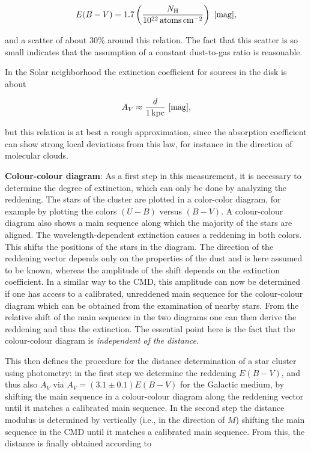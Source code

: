 \documentclass[a4paper,11pt]{article}
\begin{document}
\begin{align*}
    E(B-V) = 1.7 \left(\frac{N_\mathrm{H}}{10^{22}\,{\rm atoms\,cm^{-2}}}\right) ~ [{\rm mag}],
\end{align*}

{\noindent}and a scatter of about 30\% around this relation. The fact that this scatter is so small indicates that the assumption of a constant dust-to-gas ratio is reasonable.

{\noindent}In the Solar neighborhood the extinction coefficient for sources in the disk is about

\begin{align*}
    A_V \approx \frac{d}{1\,{\rm kpc}} ~ [{\rm mag}],
\end{align*}

{\noindent}but this relation is at best a rough approximation, since the absorption coefficient can show strong local deviations from this law, for instance in the direction of molecular clouds.

{\noindent}\textbf{Colour-colour diagram}: As a first step in this measurement, it is necessary to determine the degree of extinction, which can only be done by analyzing the reddening. The stars of the cluster are plotted in a color-color diagram, for example by plotting the colors $(U-B)$ versus $(B-V)$. A colour-colour diagram also shows a main sequence along which the majority of the stars are aligned. The wavelength-dependent extinction causes a reddening in both colors. This shifts the positions of the stars in the diagram. The direction of the reddening vector depends only on the properties of the dust and is here assumed to be known, whereas the amplitude of the shift depends on the extinction coefficient. In a similar way to the CMD, this amplitude can now be determined if one has access to a calibrated, unreddened main sequence for the colour-colour diagram which can be obtained from the examination of nearby stars. From the relative shift of the main sequence in the two diagrams one can then derive the reddening and thus the extinction. The essential point here is the fact that the colour-colour diagram is \textit{independent of the distance}.

{\noindent}This then defines the procedure for the distance determination of a star cluster using photometry: in the first step we determine the reddening $E(B-V)$, and thus also $A_V$ via $A_V=(3.1\pm0.1)E(B-V)$ for the Galactic medium, by shifting the main sequence in a colour-colour diagram along the reddening vector until it matches a calibrated main sequence. In the second step the distance modulus is determined by vertically (i.e., in the direction of $M$) shifting the main sequence in the CMD until it matches a calibrated main sequence. From this, the distance is finally obtained according to
\end{document}
